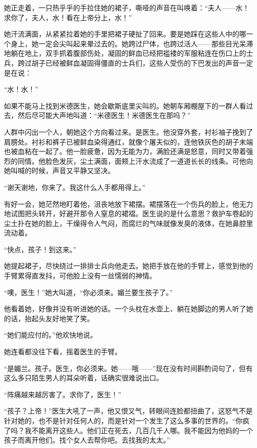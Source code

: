 \par 她正走着，一只热乎乎的手拉住她的裙子，嘶哑的声音在叫唤着：“夫人——水！求你了，夫人，水！看在上帝分上，水！”
\par 她汗流满面，从紧紧拉着她的手里把裙子硬扯了回来。要是她踩在这些人中的哪一个身上，她一定会尖叫起来晕过去的。她跨过尸体，也跨过活人——那些目光呆滞地躺在地上，双手抓着腹部伤处，凝固的鲜血已经把褴褛的军服粘连在伤口上的士兵，跨过胡子已经被鲜血凝固得僵直的士兵们，这些人受伤的下巴发出的声音一定是在说：
\par “水！水！”
\par 如果不能马上找到米德医生，她会歇斯底里尖叫的。她朝车厢棚屋下的一群人看过去，然后尽可能大声地叫道：“米德医生！米德医生在那吗？”
\par 人群中闪出一个人，朝她这个方向看过来。是医生。他没穿外套，衬衫袖子挽到了肩膀处。衬衫和裤子已被鲜血染得通红，就像个屠夫似的，连他铁灰色的胡子末端也被血粘在一起了。他一脸疲惫，因为无能为力，满脸还满是怒意，同时又带着强烈的同情。他脸色发灰，尘土满面，面颊上汗水流成了一道道长长的线条。可他向她叫喊的时候，声音又平静又坚决。
\par “谢天谢地，你来了。我这什么人手都用得上。”
\par 有好一会，她茫然地盯着他，沮丧地放下裙摆。裙摆落在一个伤兵的脸上，他无力地试图把头转开，好避开那令人窒息的裙褶。医生说的是什么意思？救护车卷起的尘土扑在她的脸上，干燥得令人气闷，而腐烂的气味就像发臭的液体，在她鼻腔里流动着。
\par “快点，孩子！到这来。”
\par 她提起裙子，尽快绕过一排排士兵向他走去。她把手放在他的手臂上，感觉到他的手臂累得直发抖，可他脸上没有一丝懦弱的神情。
\par “噢，医生！”她大叫道，“你必须来。媚兰要生孩子了。”
\par 他看着她，好像并没有听进她的话。一个头枕在水壶上、躺在她脚边的男人听了她的话，抬起头友好地笑了笑。
\par “她们能应付的。”他欢快地说。
\par 她连看都没往下看，摇着医生的手臂。
\par “是媚兰。孩子。医生，你必须来。她——哦——”现在没有时间斟酌词句了，但有这么多只陌生男人的耳朵听着，话确实很难说出口。
\par “阵痛越来越厉害了。求你了，医生！”
\par “孩子？上帝！”医生大吼了一声，他又恨又气，转眼间连脸都扭曲了，这怒气不是针对她的，也不是针对任何人的，而是针对一个发生了这么多事的世界的。“你疯了吗？我不能离开这些人。他们正在死去，几百几千人哪。我不能因为他妈的一个孩子而离开他们。找个女人去帮你吧。去找我的太太。”
